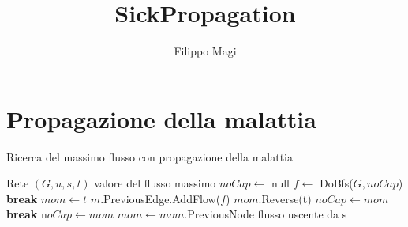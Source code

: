 \documentclass{article}
\title{SickPropagation}
\author{Filippo Magi }
\begin{document}
\maketitle

\section{Propagazione della malattia}
\begin{algorithm}
\caption{Ricerca del massimo flusso con propagazione della malattia}
\begin{algorithmic}
\REQUIRE Rete $(G,u,s,t)$
\ENSURE valore del flusso massimo
\STATE $noCap \leftarrow$ null
\STATE $f \leftarrow$ DoBfs($G,noCap$)
\STATE \textbf{break}
\ENDIF
\STATE $mom \leftarrow t$
\STATE $m$.PreviousEdge.AddFlow($f$)
\STATE $mom$.Reverse(t) 
\STATE $noCap \leftarrow mom$
\STATE \textbf{break}
\ENDIF
{}
\STATE n$oCap \leftarrow mom$
\ENDIF
\STATE $mom \leftarrow mom$.PreviousNode
\ENDWHILE
\ENDWHILE
\RETURN flusso uscente da s
\end{algorithmic}
\end{algorithm}
\end{document}

